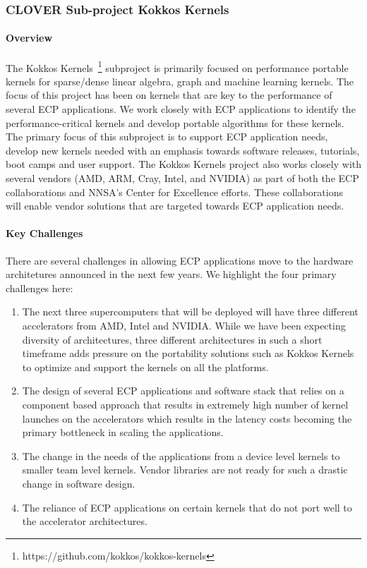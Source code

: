 \subsubsection{CLOVER Sub-project Kokkos Kernels} 
\paragraph{Overview} 
The Kokkos Kernels~\footnote{https://github.com/kokkos/kokkos-kernels} subproject is primarily focused on performance portable kernels
for sparse/dense linear algebra, graph and machine learning kernels. The
focus of this project has been on kernels that are key to the performance of
several ECP applications. We work closely with ECP applications to identify the
performance-critical kernels and develop portable algorithms for these kernels.
The primary focus of this subproject is to support ECP application needs, develop new
kernels needed with an emphasis towards software releases, tutorials, boot camps
and user support. The Kokkos Kernels project also works closely with several vendors
(AMD, ARM, Cray, Intel, and NVIDIA) as part of both the ECP collaborations and
NNSA's Center for Excellence efforts. These collaborations will  enable vendor solutions
that are targeted towards ECP application needs.

\paragraph{Key  Challenges}
There are several challenges in allowing ECP applications move to the hardware architetures
announced in the next few years. We highlight the four primary challenges here:
\begin{enumerate}
\item 
The next three supercomputers that will be deployed will have
three different accelerators from AMD, Intel and NVIDIA. While we have been expecting diversity of architectures, three
different architectures in such a short timeframe adds pressure on the portability
solutions such as Kokkos Kernels to optimize and support the kernels on all the platforms.
\item
The design of several ECP applications and software stack that relies on a component based
approach that results in extremely high number of kernel launches on the accelerators which
results in the latency costs becoming the primary bottleneck in scaling the applications.
\item
The change in the needs of the applications from a device level kernels to smaller team level kernels. Vendor
libraries are not ready for such a drastic change in software design.
\item 
The reliance of ECP applications on certain kernels that do not port well to the  accelerator architectures.
\end{enumerate}


